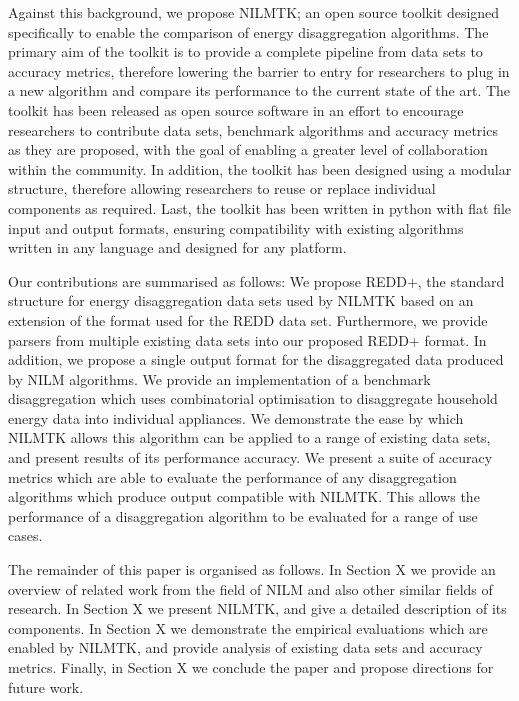 \documentclass{sig-alternate}
\begin{document}
Against this background, we propose NILMTK; an open source toolkit designed specifically to enable the comparison of energy disaggregation algorithms. The primary aim of the toolkit is to provide a complete pipeline from data sets to accuracy metrics, therefore lowering the barrier to entry for researchers to plug in a new algorithm and compare its performance to the current state of the art. The toolkit has been released as open source software in an effort to encourage researchers to contribute data sets, benchmark algorithms and accuracy metrics as they are proposed, with the goal of enabling a greater level of collaboration within the community. In addition, the toolkit has been designed using a modular structure, therefore allowing researchers to reuse or replace individual components as required. Last, the toolkit has been written in python with flat file input and output formats, ensuring compatibility with existing algorithms written in any language and designed for any platform.

Our contributions are summarised as follows:
We propose REDD+, the standard structure for energy disaggregation data sets used by NILMTK based on an extension of the format used for the REDD data set. Furthermore, we provide parsers from multiple existing data sets into our proposed REDD+ format. In addition, we propose a single output format for the disaggregated data produced by NILM algorithms.
We provide an implementation of a benchmark disaggregation which uses combinatorial optimisation to disaggregate household energy data into individual appliances. We demonstrate the ease by which NILMTK allows this algorithm can be applied to a range of existing data sets, and present results of its performance accuracy.
We present a suite of accuracy metrics which are able to evaluate the performance of any disaggregation algorithms which produce output compatible with NILMTK. This allows the performance of a disaggregation algorithm to be evaluated for a range of use cases.

The remainder of this paper is organised as follows. In Section X we provide an overview of related work from the field of NILM and also other similar fields of research. In Section X we present NILMTK, and give a detailed description of its components. In Section X we demonstrate the empirical evaluations which are enabled by NILMTK, and provide analysis of existing data sets and accuracy metrics. Finally, in Section X we conclude the paper and propose directions for future work.
\end{document}
